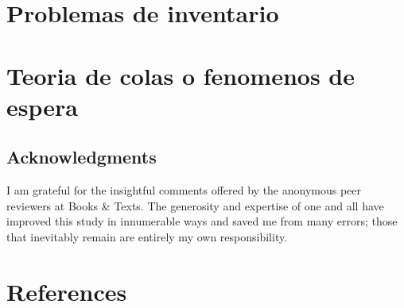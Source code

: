 \documentclass[
  letterpaper,
  DIV=11,
  numbers=noendperiod]{scrreprt}
\theoremstyle{definition}
\theoremstyle{definition}
\theoremstyle{remark}
\begin{document}
\hypertarget{problemas-de-inventario}{%
\chapter{Problemas de inventario}\label{problemas-de-inventario}}

\hypertarget{teoria-de-colas-o-fenomenos-de-espera}{%
\chapter{Teoria de colas o fenomenos de
espera}\label{teoria-de-colas-o-fenomenos-de-espera}}

\hypertarget{acknowledgments}{%
\section{Acknowledgments}\label{acknowledgments}}

I am grateful for the insightful comments offered by the anonymous peer
reviewers at Books \& Texts. The generosity and expertise of one and all
have improved this study in innumerable ways and saved me from many
errors; those that inevitably remain are entirely my own responsibility.


\hypertarget{references}{%
\chapter*{References}\label{references}}


\printbibliography[heading=none]

\cleardoublepage
{}
{}
\appendix


\printbibliography[title=apendice]
\end{document}
